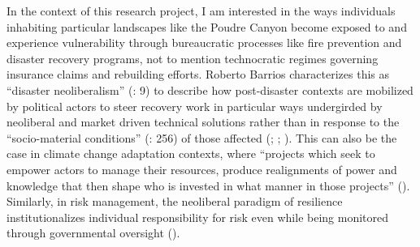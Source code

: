 \documentclass[
]{article}
\begin{document}
In the context of this research project, I am interested in the ways individuals inhabiting particular landscapes like the Poudre Canyon become exposed to and experience vulnerability through bureaucratic processes like fire prevention and disaster recovery programs, not to mention technocratic regimes governing insurance claims and rebuilding efforts. Roberto Barrios characterizes this as ``disaster neoliberalism'' (: 9) to describe how post-disaster contexts are mobilized by political actors to steer recovery work in particular ways undergirded by neoliberal and market driven technical solutions rather than in response to the ``socio-material conditions'' (: 256) of those affected (; ; ). This can also be the case in climate change adaptation contexts, where ``projects which seek to empower actors to manage their resources, produce realignments of power and knowledge that then shape who is invested in what manner in those projects'' (). Similarly, in risk management, the neoliberal paradigm of resilience institutionalizes individual responsibility for risk even while being monitored through governmental oversight ().
\end{document}

